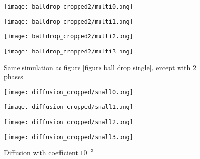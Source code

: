 \begin{figure}[H]
    \centering
    
    \begin{minipage}[t]{.24\linewidth}
        \centering
        \vspace{0pt}
        \texttt{[image: balldrop\_cropped2/multi0.png]}
    \end{minipage}
    \begin{minipage}[t]{.24\linewidth}
        \centering
        \vspace{0pt}
        \texttt{[image: balldrop\_cropped2/multi1.png]}
    \end{minipage}
    \begin{minipage}[t]{.24\linewidth}
        \centering
        \vspace{0pt}
        \texttt{[image: balldrop\_cropped2/multi2.png]}
    \end{minipage}
    \begin{minipage}[t]{.24\linewidth}
        \centering
        \vspace{0pt}
        \texttt{[image: balldrop\_cropped2/multi3.png]}
    \end{minipage}

    \caption{Same simulation as figure \ref{figure ball drop single}, except with 2 phases}
    \label{figure ball drop multi}
\end{figure}


\begin{figure}[H]
    \centering
    
    \begin{minipage}[t]{.24\linewidth}
        \centering
        \vspace{0pt}
        \texttt{[image: diffusion\_cropped/small0.png]}
    \end{minipage}
    \begin{minipage}[t]{.24\linewidth}
        \centering
        \vspace{0pt}
        \texttt{[image: diffusion\_cropped/small1.png]}
    \end{minipage}
    \begin{minipage}[t]{.24\linewidth}
        \centering
        \vspace{0pt}
        \texttt{[image: diffusion\_cropped/small2.png]}
    \end{minipage}
    \begin{minipage}[t]{.24\linewidth}
        \centering
        \vspace{0pt}
        \texttt{[image: diffusion\_cropped/small3.png]}
    \end{minipage}

    \caption{Diffusion with coefficient $10^{-3}$}
    \label{diffusion 1e-3}
\end{figure}



